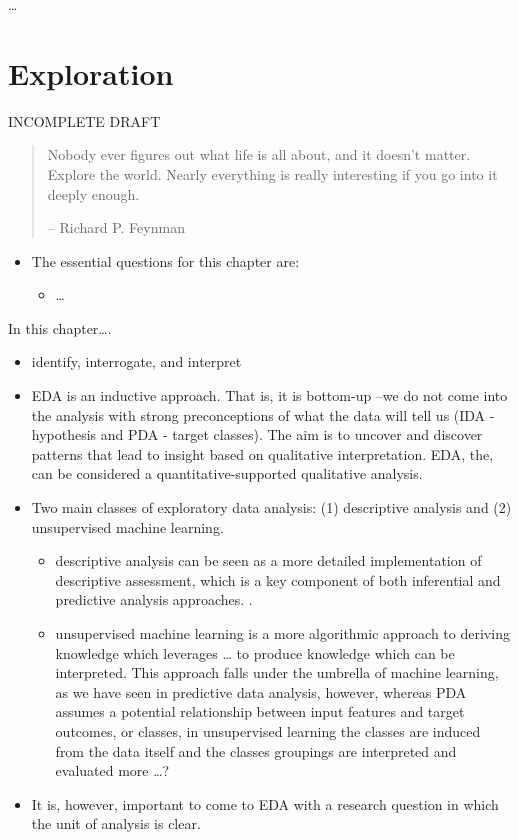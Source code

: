 \documentclass[
]{article}
\providecommand{\tightlist}{%
  \setlength{\itemsep}{0pt}\setlength{\parskip}{0pt}}
\newenvironment{rmdblock}[1]
  {\begin{shaded*}
  \begin{itemize}
  \renewcommand{\labelitemi}{
    \raisebox{-.5\height}[0pt][0pt]{
      {\setkeys{Gin}{width=2em,keepaspectratio}\texttt{[image: assets/images/\#1]}}
    }
  }
  \item
  }
  {
  \end{itemize}
  \end{shaded*}
  }
\newenvironment{rmdkey}
  {\begin{rmdblock}{key}}
  {\end{rmdblock}}
\begin{document}
\ldots{}

\hypertarget{exploration}{%
\section{Exploration}\label{exploration}}

INCOMPLETE DRAFT

\begin{quote}
Nobody ever figures out what life is all about, and it doesn't matter. Explore the world. Nearly everything is really interesting if you go into it deeply enough.

-- Richard P. Feynman
\end{quote}

\begin{rmdkey}
The essential questions for this chapter are:

\begin{itemize}
\tightlist
\item
  \ldots{}
\end{itemize}
\end{rmdkey}

In this chapter\ldots.

\begin{itemize}
\item
  identify, interrogate, and interpret
\item
  EDA is an inductive approach. That is, it is bottom-up --we do not come into the analysis with strong preconceptions of what the data will tell us (IDA - hypothesis and PDA - target classes). The aim is to uncover and discover patterns that lead to insight based on qualitative interpretation. EDA, the, can be considered a quantitative-supported qualitative analysis.
\item
  Two main classes of exploratory data analysis: (1) descriptive analysis and (2) unsupervised machine learning.

  \begin{itemize}
  \tightlist
  \item
    descriptive analysis can be seen as a more detailed implementation of descriptive assessment, which is a key component of both inferential and predictive analysis approaches. .
  \item
    unsupervised machine learning is a more algorithmic approach to deriving knowledge which leverages \ldots{} to produce knowledge which can be interpreted. This approach falls under the umbrella of machine learning, as we have seen in predictive data analysis, however, whereas PDA assumes a potential relationship between input features and target outcomes, or classes, in unsupervised learning the classes are induced from the data itself and the classes groupings are interpreted and evaluated more \ldots?
  \end{itemize}
\item
  It is, however, important to come to EDA with a research question in which the unit of analysis is clear.
\end{itemize}
\end{document}
